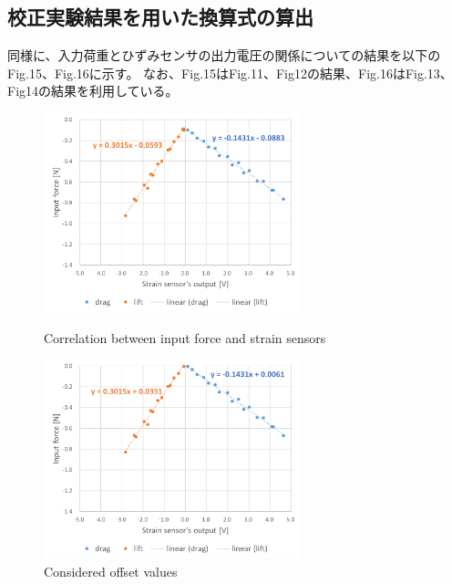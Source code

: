 \documentclass[twocolumn,a4j]{jsarticle}
\begin{document}
\subsection{校正実験結果を用いた換算式の算出}
同様に、入力荷重とひずみセンサの出力電圧の関係についての結果を以下のFig.15、Fig.16に示す。
なお、Fig.15はFig.11、Fig12の結果、Fig.16はFig.13、Fig14の結果を利用している。
\begin{figure}[htbp]
    \footnotesize
    \begin{center}
        \includegraphics[width=75mm]{../images/convert.png}
        \caption{Correlation between input force and strain sensors}
        \includegraphics[width=75mm]{../images/convert_offset.png}
        \caption{Considered offset values}
    \end{center}
\end{figure}
\end{document}
